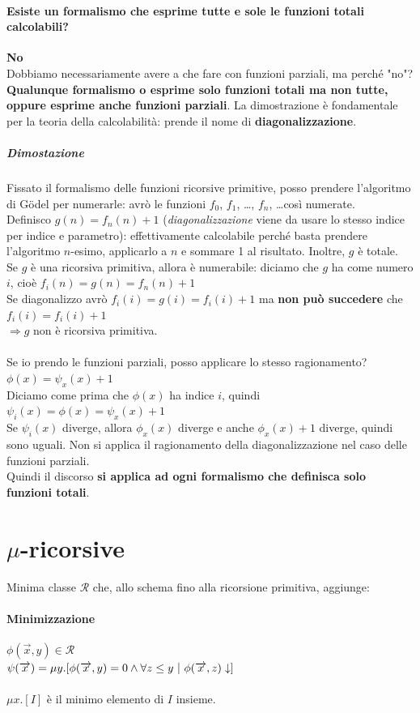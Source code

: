 \documentclass[10pt]{book}
\begin{document}
\paragraph{Esiste un formalismo che esprime tutte e sole le funzioni totali calcolabili?} \textbf{No}\\
Dobbiamo necessariamente avere a che fare con funzioni parziali, ma perché "no"?\\
\textbf{Qualunque formalismo o esprime solo funzioni totali ma non tutte, oppure esprime anche funzioni parziali}. La dimostrazione è fondamentale per la teoria della calcolabilità: prende il nome di \textbf{diagonalizzazione}.
\subparagraph{Dimostazione} Fissato il formalismo delle funzioni ricorsive primitive, posso prendere l'algoritmo di G\"{o}del per numerarle: avrò le funzioni $f_0$, $f_1$, \ldots, $f_n$, \ldots così numerate.\\
Definisco $g(n) = f_n(n) + 1$ (\textit{diagonalizzazione} viene da usare lo stesso indice per indice e parametro): effettivamente calcolabile perché basta prendere l'algoritmo $n$-esimo, applicarlo a $n$ e sommare 1 al risultato. Inoltre, $g$ è totale.\\
Se $g$ è una ricorsiva primitiva, allora è numerabile: diciamo che $g$ ha come numero $i$, cioè $f_i(n) = g(n) = f_n(n) + 1$\\
Se diagonalizzo avrò $f_i(i) = g(i) = f_i(i) + 1$ ma \textbf{non può succedere} che $f_i(i) = f_i(i) + 1$\\
$\Rightarrow g$ non è ricorsiva primitiva.\\\\
Se io prendo le funzioni parziali, posso applicare lo stesso ragionamento?\\
$\phi(x) = \psi_x(x) + 1$\\
Diciamo come prima che $\phi(x)$ ha indice $i$, quindi $\psi_i(x) = \phi(x) = \psi_x(x) + 1$\\
Se $\psi_i(x)$ diverge, allora $\phi_x(x)$ diverge e anche $\phi_x(x) + 1$ diverge, quindi sono uguali. Non si applica il ragionamento della diagonalizzazione nel caso delle funzioni parziali.\\
Quindi il discorso \textbf{si applica ad ogni formalismo che definisca solo funzioni totali}.
\section{$\mu$-ricorsive}
Minima classe $\mathscr{R}$ che, allo schema fino alla ricorsione primitiva, aggiunge:
\paragraph{Minimizzazione} $\phi(\overrightarrow{x}, y) \in \mathscr{R}$\\
$\psi(\overrightarrow{x}) = \mu y.[\phi(\overrightarrow{x}, y) = 0 \wedge \forall z \leq y\:\:\vline\:\: \phi(\overrightarrow{x}, z)\downarrow] $\\\\
$\mu x.[I]$ è il minimo elemento di $I$ insieme.
\pagebreak
\end{document}
